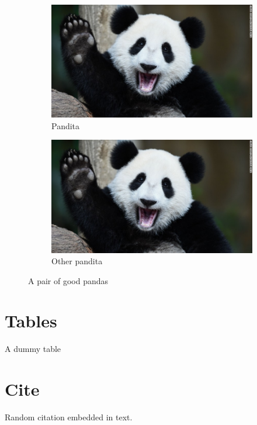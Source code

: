 \documentclass{article}
\begin{document}
\begin{figure}[h!]
    \centering
    \begin{subfigure}[b]{0.4\linewidth} %
        \includegraphics[width=\linewidth]{images/panda.jpg}
        \caption{Pandita}
    \end{subfigure}
    \begin{subfigure}[b]{0.4\linewidth}
        \includegraphics[width=\linewidth]{images/panda.jpg}
        \caption{Other pandita}
    \end{subfigure}
    \caption{A pair of good pandas}
\end{figure}

\section{Tables}

\begin{table}
    \caption{A dummy table}
\end{table}

\section{Cite}
Random citation \autocite{DUMMY:1} embedded in text.


\printbibliography

\begin{appendix}
    \listoffigures
    \listoftables
\end{appendix}
\newpage
\end{document}
